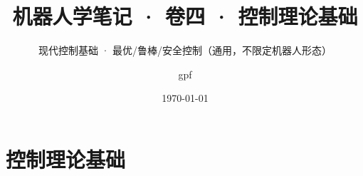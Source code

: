 
\usepackage{xr-hyper}


\title{机器人学笔记 · 卷四 · 控制理论基础}
\subtitle{现代控制基础 · 最优/鲁棒/安全控制（通用，不限定机器人形态）}
\author{gpf}\date{\today}


\maketitle
\frontmatter
{}
\tableofcontents
\mainmatter
\part{控制理论基础}















\backmatter
\nocite{*}
\printbibliography[heading=bibintoc, title={参考文献}]

